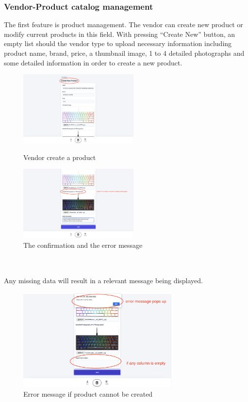 \documentclass{article}
\begin{document}
\subsubsection{Vendor-Product catalog management}
The first feature is product management. The vendor can create new product or modify current products in this field. With pressing “Create New” button, an empty list should the vendor type to upload necessary information including product name, brand, price, a thumbnail image, 1 to 4 detailed photographs and some detailed information in order to create a new product. 
\begin{figure}[htbp]
\centering
\begin{minipage}[t]{0.48\textwidth}
\centering
\includegraphics[width=6cm]{create example 1.png}
\caption{Vendor create a product}
\end{minipage}
\begin{minipage}[t]{0.48\textwidth}
\centering
\includegraphics[width=6cm]{create example 2.png}
\caption{The confirmation and the error message}
\end{minipage}
\end{figure}
\newpage
\leavevmode
\\\\
Any missing data will result in a relevant message being displayed. 
\begin{figure}[!htp]
    \centering
    \includegraphics[width=0.72\textwidth]{error message.png}
    \caption{\label{fig:error message}Error message if product cannot be created}
\end{figure}
\end{document}
